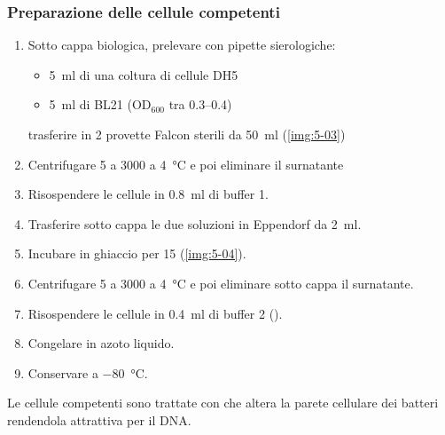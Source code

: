 \subsubsection{Preparazione delle cellule competenti}
\begin{enumerate}[person,itemsep=8pt]
	\item Sotto cappa biologica, prelevare con pipette sierologiche:
	      \begin{itemize}[person]
		      \item \qty{5}{\ml} di una coltura di cellule DH5\textalpha
		      \item \qty{5}{\ml} di BL21 (\(\text{OD}_{600}\) tra \numrange{0.3}{0.4})
	      \end{itemize}
	      trasferire in 2 provette Falcon sterili da \qty{50}{\ml} (\autoref{img:5-03})
	\item Centrifugare \qty{5}{\min} a \qty{3000}{\giri} a \qty{4}{\celsius} e poi eliminare il surnatante
	\item Risospendere le cellule in \qty{0.8}{\ml} di buffer 1.
	\item Trasferire sotto cappa le due soluzioni in \foreignlanguage{german}{Eppendorf} da \qty{2}{\ml}.
	\item Incubare in ghiaccio per \qty{15}{\min} (\autoref{img:5-04}).
	\item Centrifugare \qty{5}{\min} a \qty{3000}{\giri} a \qty{4}{\celsius} e poi eliminare sotto cappa il surnatante.
	\item Risospendere le cellule in \qty{0.4}{\ml} di buffer 2 ().
	\item Congelare in azoto liquido.
	\item Conservare a \qty{-80}{\celsius}.
\end{enumerate}
Le cellule competenti sono trattate con  che altera la parete cellulare dei batteri rendendola attrattiva per il DNA.

\begingroup
{}

\vspace{0.10cm}
\endgroup